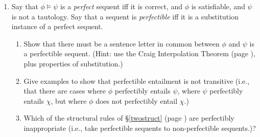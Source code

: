 {\begin{enumerate}
\item Say that $\phi \vDash \psi$ is a \emph{perfect} sequent iff it is correct, and $\phi$ is satisfiable, and	$\psi$ is not a tautology. Say that a sequent is \emph{perfectible} iff it is a substitution instance of a perfect sequent. \begin{enumerate}
	\item Show that there must be a sentence letter in common between $\phi$ and $\psi$ is a perfectible sequent. (Hint: use the Craig Interpolation Theorem (page \pageref{thmcraig}), plus properties of substitution.)
	\item Give examples to show that perfectible entailment is not transitive (i.e., that there are cases where $\phi$ perfectibly entails $\psi$, where $\psi$ perfectibly entails $\chi$, but where $\phi$ does not perfectibly entail $\chi$.)
	\item Which of the structural rules of \S\ref{twostruct} (page \pageref{twostruct}) are perfectibly inappropriate (i.e., take perfectible sequents to non-perfectible sequents.)?
\end{enumerate}
	

\end{enumerate}}
